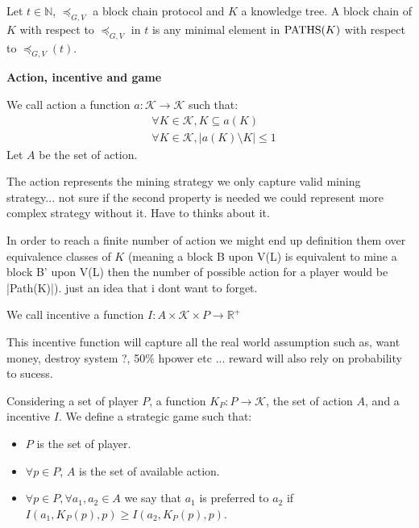 \begin{mydef}
Let $t \in \mathbb N$, $\preceq_{G,V}$ a block chain protocol and $K$ a knowledge tree. 
A block chain of $K$ with respect to $\preceq_{G,V}$ in $t$ is any minimal element in $\text{PATHS}(K)$ with respect to $\preceq_{G,V}(t)$.
\end{mydef}

\medskip
\noindent
\textbf{Action, incentive and game}
\begin{mydef}
	We call action a function $a: \mathcal{K} \rightarrow \mathcal{K}$ such that: 
	\begin{eqnarray*}	
		&\forall K \in \mathcal{K}, K \subseteq a(K) \\
		&\forall K \in \mathcal{K} , |a(K) \setminus K| \leq 1
	\end{eqnarray*}
	Let $A$ be the set of action.
\end{mydef}
The action represents the mining strategy we only capture valid mining strategy...  not sure if the second property is needed we could represent more complex strategy without it. Have to thinks about it.

\begin{myrem}
	In order to reach a finite number of action we might end up definition them over equivalence classes of $K$ (meaning a block B upon V(L) is equivalent to mine a block B' upon V(L) then the number of possible action for a player would be |Path(K)|). just an idea that i dont want to forget.
\end{myrem}



\begin{mydef}
	We call incentive a function $I : A \times \mathcal{K} \times P \rightarrow \mathbb{R}^+$ 
\end{mydef}
This incentive function will capture all the real world assumption such as, want money, destroy system ?,  50\% hpower etc ... reward will also rely on probability to sucess.


\begin{mydef}
	Considering a set of player $P$, a function $K_P : P \rightarrow \mathcal{K}$, the set of action $A$, and a incentive $I$. We define a strategic game such that:
	\begin{itemize}
		\item $P$ is the set of player.
		\item $\forall p \in P$, $A$ is the set of available action.
		\item $\forall p \in P, \forall a_1, a_2 \in A$ we say that $a_1$ is preferred to $a_2$ if $I(a_1,K_P(p),p) \geq I(a_2,K_P(p),p)$.
	\end{itemize}
\end{mydef}

